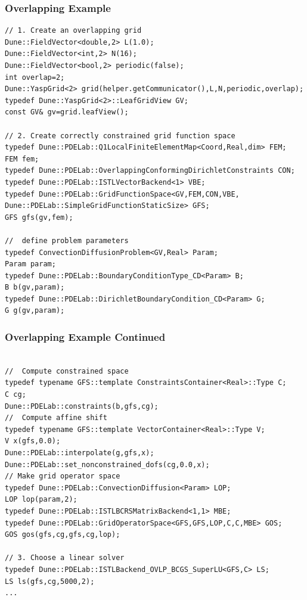 \begin{frame}[fragile]
  \frametitle{Overlapping Example}
  \begin{lstlisting}[basicstyle=\tiny]
// 1. Create an overlapping grid
Dune::FieldVector<double,2> L(1.0);
Dune::FieldVector<int,2> N(16);
Dune::FieldVector<bool,2> periodic(false);
int overlap=2; 
Dune::YaspGrid<2> grid(helper.getCommunicator(),L,N,periodic,overlap);
typedef Dune::YaspGrid<2>::LeafGridView GV;
const GV& gv=grid.leafView();

// 2. Create correctly constrained grid function space
typedef Dune::PDELab::Q1LocalFiniteElementMap<Coord,Real,dim> FEM;
FEM fem;
typedef Dune::PDELab::OverlappingConformingDirichletConstraints CON;
typedef Dune::PDELab::ISTLVectorBackend<1> VBE;
typedef Dune::PDELab::GridFunctionSpace<GV,FEM,CON,VBE,
Dune::PDELab::SimpleGridFunctionStaticSize> GFS;
GFS gfs(gv,fem);

//  define problem parameters
typedef ConvectionDiffusionProblem<GV,Real> Param;
Param param;
typedef Dune::PDELab::BoundaryConditionType_CD<Param> B;
B b(gv,param);
typedef Dune::PDELab::DirichletBoundaryCondition_CD<Param> G;
G g(gv,param);
\end{lstlisting}  
\end{frame}
\begin{frame}[fragile]
\frametitle<presentation>{Overlapping Example Continued}
  \begin{lstlisting}[basicstyle=\tiny]

//  Compute constrained space
typedef typename GFS::template ConstraintsContainer<Real>::Type C;
C cg;
Dune::PDELab::constraints(b,gfs,cg);
//  Compute affine shift
typedef typename GFS::template VectorContainer<Real>::Type V;
V x(gfs,0.0);
Dune::PDELab::interpolate(g,gfs,x);
Dune::PDELab::set_nonconstrained_dofs(cg,0.0,x);
// Make grid operator space
typedef Dune::PDELab::ConvectionDiffusion<Param> LOP; 
LOP lop(param,2);
typedef Dune::PDELab::ISTLBCRSMatrixBackend<1,1> MBE;
typedef Dune::PDELab::GridOperatorSpace<GFS,GFS,LOP,C,C,MBE> GOS;
GOS gos(gfs,cg,gfs,cg,lop);

// 3. Choose a linear solver 
typedef Dune::PDELab::ISTLBackend_OVLP_BCGS_SuperLU<GFS,C> LS;
LS ls(gfs,cg,5000,2);
...
\end{lstlisting}
\end{frame}

